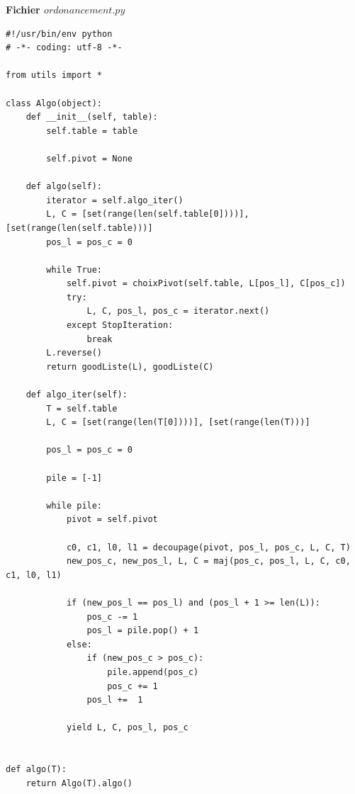 \documentclass[a4paper]{report}
\renewcommand{\textbf}[1]{\begingroup\bfseries\mathversion{bold}#1\endgroup}
\begin{document}
\textbf{Fichier $ordonancement.py$}
\begin{lstlisting}
#!/usr/bin/env python
# -*- coding: utf-8 -*-

from utils import *

class Algo(object):
    def __init__(self, table):
        self.table = table
        
        self.pivot = None

    def algo(self):
        iterator = self.algo_iter()
        L, C = [set(range(len(self.table[0])))], [set(range(len(self.table)))]        
        pos_l = pos_c = 0
        
        while True:
            self.pivot = choixPivot(self.table, L[pos_l], C[pos_c])
            try:
                L, C, pos_l, pos_c = iterator.next()
            except StopIteration:
                break
        L.reverse()
        return goodListe(L), goodListe(C)

    def algo_iter(self):
        T = self.table
        L, C = [set(range(len(T[0])))], [set(range(len(T)))]
        
        pos_l = pos_c = 0

        pile = [-1]
        
        while pile:
            pivot = self.pivot
  
            c0, c1, l0, l1 = decoupage(pivot, pos_l, pos_c, L, C, T)
            new_pos_c, new_pos_l, L, C = maj(pos_c, pos_l, L, C, c0, c1, l0, l1)

            if (new_pos_l == pos_l) and (pos_l + 1 >= len(L)):
                pos_c -= 1
                pos_l = pile.pop() + 1
            else:
                if (new_pos_c > pos_c):
                    pile.append(pos_c)
                    pos_c += 1
                pos_l +=  1
            
            yield L, C, pos_l, pos_c


def algo(T):
    return Algo(T).algo()

\end{lstlisting}
\end{document}

